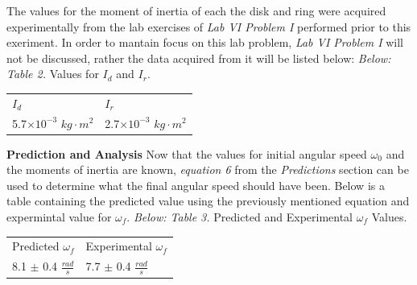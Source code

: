 \documentclass[12pt,letterpaper]{article}
\begin{document}
\newline\newline
The values for the moment of inertia of each the disk and ring were acquired experimentally from the lab exercises of \textit{Lab VI Problem I} performed prior to this exeriment. In order to mantain focus on this lab problem, \textit{Lab VI Problem I} will not be discussed, rather the data acquired from it will be listed below:
\newline\newline
\textit{Below: Table 2.} Values for \(I_d\) and \(I_r\).
{\renewcommand{\arraystretch}{1.2}
\begin{table}[h]
\hspace{1.7in}
\begin{tabular}{ll}
\hspace{.5in}\(I_d\) \hspace{.5in}& \hspace{.95in} \(I_r\)\\
5.7\(\times 10^{-3}\) \(kg\cdot m^2\)\hspace{.25in}&\hspace{.5in}2.7\(\times 10^{-3}\) \(kg\cdot m^2\)\\             
\end{tabular}
\end{table}
\newline
}
\textbf{Prediction and Analysis}
\newline
Now that the values for initial angular speed \(\omega_0\) and the moments of inertia are known, \textit{equation 6} from the \textit{Predictions} section can be used to determine what the final angular speed should have been. Below is a table containing the predicted value using the previously mentioned equation and expermintal value for \(\omega_f\).
\newline\newline
\textit{Below: Table 3.} Predicted and Experimental \(\omega_f\) Values.
{\renewcommand{\arraystretch}{1.2}
\begin{table}[h]
\hspace{2in}
\begin{tabular}{ll}
\hspace{0in}Predicted \(\omega_f\) \hspace{.5in}& \hspace{.45in}Experimental \(\omega_f\)\\
8.1 \(\pm\) 0.4 \(\frac{rad}{s}\)\hspace{.25in}&\hspace{.5in} 7.7 \(\pm\) 0.4 \(\frac{rad}{s}\)\\             
\end{tabular}
\end{table}
\newline
}
\end{document}

